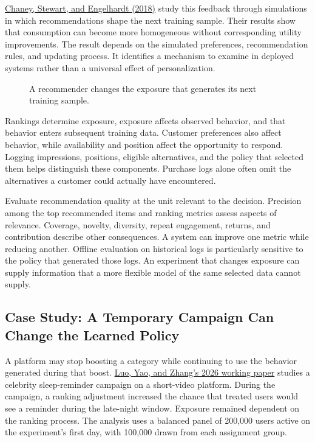 \href{https://arxiv.org/abs/1710.11214}{Chaney, Stewart, and Engelhardt
(2018)} study this feedback through simulations in which recommendations
shape the next training sample. Their results show that consumption can
become more homogeneous without corresponding utility improvements. The
result depends on the simulated preferences, recommendation rules, and
updating process. It identifies a mechanism to examine in deployed
systems rather than a universal effect of personalization.

\begin{figure}[htbp]
\centering

\caption{A recommender changes the exposure that generates its next training sample.}\label{fig:M08_feedback}
\end{figure}

Rankings determine exposure, exposure affects observed behavior, and
that behavior enters subsequent training data. Customer preferences also
affect behavior, while availability and position affect the opportunity
to respond. Logging impressions, positions, eligible alternatives, and
the policy that selected them helps distinguish these components.
Purchase logs alone often omit the alternatives a customer could
actually have encountered.

Evaluate recommendation quality at the unit relevant to the decision.
Precision among the top recommended items and ranking metrics assess
aspects of relevance. Coverage, novelty, diversity, repeat engagement,
returns, and contribution describe other consequences. A system can
improve one metric while reducing another. Offline evaluation on
historical logs is particularly sensitive to the policy that generated
those logs. An experiment that changes exposure can supply information
that a more flexible model of the same selected data cannot supply.

\hypertarget{M08-case-study-a-temporary-campaign-can-change-the-learned-policy}{%
\subsection{Case Study: A Temporary Campaign Can Change the Learned
Policy}\label{M08-case-study-a-temporary-campaign-can-change-the-learned-policy}}

\noindent A platform may stop boosting a category while continuing to use the
behavior generated during that boost.
\href{https://arxiv.org/abs/2606.08265}{Luo, Yao, and Zhang's 2026
working paper} studies a celebrity sleep-reminder campaign on a
short-video platform. During the campaign, a ranking adjustment
increased the chance that treated users would see a reminder during the
late-night window. Exposure remained dependent on the ranking process.
The analysis uses a balanced panel of 200,000 users active on the
experiment's first day, with 100,000 drawn from each assignment group.

